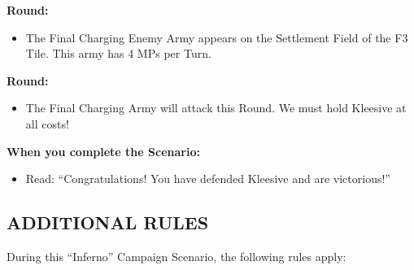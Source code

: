 \begin{multicols*}{2}
\textbf{ Round:}
\begin{itemize}
  \item The Final Charging Enemy Army appears on the Settlement Field of the F3 Tile. This army has 4 MPs per Turn.
\end{itemize}

\textbf{ Round:}
\begin{itemize}
  \item The Final Charging Army will attack this Round. We must hold Kleesive at all costs!
\end{itemize}

\textbf{When you complete the Scenario:}
\begin{itemize}
  \item Read: ``Congratulations! You have defended Kleesive and are victorious!''
\end{itemize}

\subsection*{\MakeUppercase{Additional Rules}}

During this ``Inferno'' Campaign Scenario, the following rules apply:


\end{multicols*}
